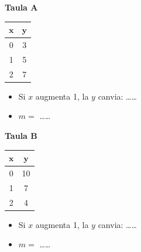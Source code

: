 \documentclass[12pt,a4paper]{article}
\begin{document}
\begin{minipage}{0.45\textwidth}
    \textbf{Taula A}
    \begin{center}
    \begin{tabular}{|c|c|}
        \hline
        $\mathbf{x}$ & $\mathbf{y}$ \\ \hline
        0 & 3 \\ \hline
        1 & 5 \\ \hline
        2 & 7 \\ \hline
    \end{tabular}
    \end{center}
    \begin{itemize}
        \item Si $x$ augmenta 1, la $y$ canvia: \dots\dots
        \item $m = $ \dots\dots
    \end{itemize}
\end{minipage}
\hfill
\begin{minipage}{0.45\textwidth}
    \textbf{Taula B}
    \begin{center}
    \begin{tabular}{|c|c|}
        \hline
        $\mathbf{x}$ & $\mathbf{y}$ \\ \hline
        0 & 10 \\ \hline
        1 & 7 \\ \hline
        2 & 4 \\ \hline
    \end{tabular}
    \end{center}
    \begin{itemize}
        \item Si $x$ augmenta 1, la $y$ canvia: \dots\dots
        \item $m = $ \dots\dots
    \end{itemize}
\end{minipage}

\vspace{1cm}
\end{document}
